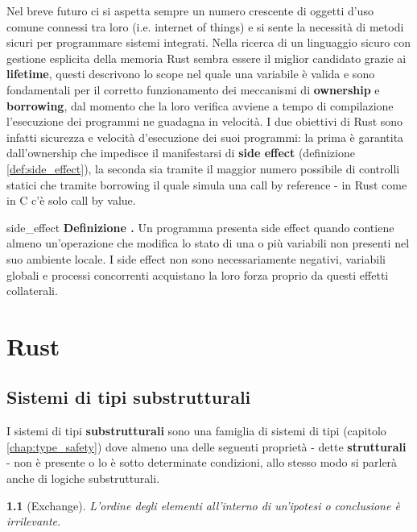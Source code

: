 \documentclass[Lau,binding=0.6cm]{sapthesis}
\newtheorem{lemma}[theorem]{}
\newenvironment{myDefinition}[2]{ \begin{Definizione}[adjusted title=#1]{}{#2}
    \textbf{Definizione \thetcbcounter.} }{\end{Definizione}}
\begin{document}
Nel breve futuro ci si aspetta sempre un numero crescente di oggetti d'uso comune connessi tra loro (i.e. internet of things) e si sente la necessità di metodi sicuri per programmare sistemi integrati. 
Nella ricerca di un linguaggio sicuro con gestione esplicita della memoria Rust sembra essere il miglior candidato grazie ai \textbf{lifetime}, questi descrivono lo scope nel quale una variabile è valida e sono fondamentali per il corretto funzionamento dei meccanismi di \textbf{ownership} e \textbf{borrowing}, dal momento che la loro verifica avviene a tempo di compilazione l'esecuzione dei programmi ne guadagna in velocità. 
I due obiettivi di Rust sono infatti sicurezza e velocità d'esecuzione dei suoi programmi: la prima è garantita dall'ownership che impedisce il manifestarsi di \textbf{side effect} (definizione \ref{def:side_effect}), la seconda sia tramite il maggior numero possibile di controlli statici che tramite borrowing il quale simula una call by reference - in Rust come in C c'è solo call by value. 

\begin{myDefinition}{Side effect}{side_effect}
    Un programma presenta side effect quando contiene almeno un'operazione che modifica lo stato di una o più variabili non presenti nel suo ambiente locale.
    I side effect non sono necessariamente negativi, variabili globali e processi concorrenti acquistano la loro forza proprio da questi effetti collaterali.
\end{myDefinition}

\chapter{Rust}

\section{Sistemi di tipi substrutturali}

I sistemi di tipi \textbf{substrutturali} sono una famiglia di sistemi di tipi (capitolo \ref{chap:type_safety}) dove almeno una delle seguenti proprietà - dette \textbf{strutturali} - non è presente o lo è sotto determinate condizioni, allo stesso modo si parlerà anche di logiche substrutturali.

\begin{lemma}[Exchange] \label{lemma:exchange}
    L'ordine degli elementi all'interno di un'ipotesi o conclusione è irrilevante.
\end{lemma}
\end{document}
